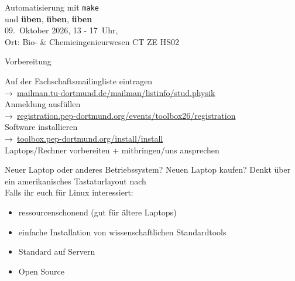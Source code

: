 \begin{frame}
  \begin{center}
    \huge Automatisierung mit \texttt{make}\\[0.5\baselineskip]
    und \textbf{üben}, \textbf{üben}, \textbf{üben}\\[0.5\baselineskip]
    09.~Oktober 2026, 13 - 17~Uhr,\\
    Ort: Bio- \& Chemieingenieurwesen CT ZE HS02
  \end{center}
\end{frame}

\begin{frame}{Vorbereitung}
  \begin{center}
    \huge
    Auf der Fachschaftsmailingliste eintragen \\
    →~\href{https://mailman.tu-dortmund.de/mailman/listinfo/stud.physik}{mailman.tu-dortmund.de/mailman/listinfo/stud.physik}\\[0.5\baselineskip]
    Anmeldung ausfüllen\\
    →~\textcolor{blue!70!black}{\href{https://registration.pep-dortmund.org/events/toolbox26/registration/}{registration.pep-dortmund.org/events/toolbox26/registration}}\\[0.5\baselineskip]
    Software installieren\\
    →~\textcolor{blue!70!black}{\href{https://toolbox.pep-dortmund.org/install/install/}{toolbox.pep-dortmund.org/install/install}}\\[0.5\baselineskip]
    Laptops/Rechner vorbereiten + mitbringen/uns ansprechen
  \end{center}
\end{frame}
\begin{frame}{Neuer Laptop oder anderes Betriebssystem?}
  \huge
  Neuen Laptop kaufen? \newline
  Denkt über ein amerikanisches Tastaturlayout nach\\[0.5\baselineskip]

  Falls ihr euch für Linux interessiert:
	\begin{itemize}
		\item ressourcenschonend (gut für ältere Laptops)
		\item einfache Installation von wissenschaftlichen Standardtools
		\item Standard auf Servern
		\item Open Source
	\end{itemize}
\end{frame}
